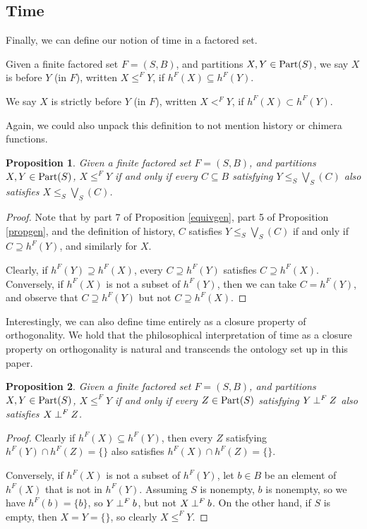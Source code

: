 \documentclass[authordate,onecolumn]{miri-tech-article}
\newtheorem{proposition}{Proposition}
\begin{document}
\subsection{Time}
Finally, we can define our notion of time in a factored set.
\begin{definition}
Given a finite factored set $F=(S,B)$, and partitions $X,Y\in \text{Part}(S)$, we say $X$ is before $Y$ (in $F$), written $X\leq^F Y$, if $h^F(X)\subseteq h^F(Y)$.

We say $X$ is strictly before $Y$ (in $F$), written $X<^FY$, if $h^F(X)\subset h^F(Y)$.
\end{definition}
Again, we could also unpack this definition to not mention history or chimera functions. 
\begin{proposition}
Given a finite factored set $F=(S,B)$, and partitions $X,Y\in \text{Part}(S)$,  $X\leq^F Y$ if and only if every $C\subseteq B$ satisfying $Y\leq_S\bigvee_S(C)$ also satisfies $X\leq_S\bigvee_S(C)$.
\end{proposition}
\begin{proof}
Note that by part 7 of Proposition \ref{equivgen}, part 5 of Proposition \ref{propgen}, and the definition of history, $C$ satisfies $Y\leq_S\bigvee_S(C)$ if and only if $C\supseteq h^F(Y)$, and similarly for $X$. 

Clearly, if $h^F(Y)\supseteq h^F(X)$, every $C\supseteq h^F(Y)$ satisfies $C\supseteq h^F(X)$. Conversely, if $h^F(X)$ is not a subset of $h^F(Y)$, then we can take $C=h^F(Y)$, and observe that $C\supseteq h^F(Y)$ but not $C\supseteq h^F(X)$.
\end{proof}
Interestingly, we can also define time entirely as a closure property of orthogonality. We hold that the philosophical interpretation of time as a closure property on orthogonality is natural and transcends the ontology set up in this paper.
\begin{proposition}
Given a finite factored set $F=(S,B)$, and partitions $X,Y\in \text{Part}(S)$, $X\leq^F Y$ if and only if every $Z\in\text{Part}(S)$ satisfying $Y\mathbin{\perp^{F}}Z$ also satisfies $X\mathbin{\perp^{F}}Z$.
\end{proposition}
\begin{proof}
Clearly if $h^F(X)\subseteq h^F(Y)$, then every $Z$ satisfying $h^F(Y)\cap h^F(Z)=\{\}$ also satisfies $h^F(X)\cap h^F(Z)=\{\}$.

Conversely, if $h^F(X)$ is not a subset of $h^F(Y)$, let $b\in B$ be an element of $h^F(X)$ that is not in $h^F(Y)$. Assuming $S$ is nonempty, $b$ is nonempty, so we have $h^F(b)=\{b\}$, so $Y\mathbin{\perp^{F}}b$, but not $X\mathbin{\perp^{F}}b$. On the other hand, if $S$ is empty, then $X=Y=\{\}$, so clearly $X\leq^F Y$.
\end{proof}
\end{document}
